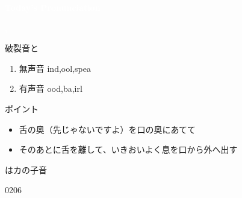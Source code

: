 \documentclass[aspectratio=169,xcolor={dvipsnames,table}]{beamer}
\begin{document}
\begin{frame}
\hypertarget{today}{}
\centering
  \textcolor{white}{\Huge\bfseries Today's Pronunciation}

 \vspace{30pt}

  \textcolor{white}{\Huge\bfseries {}, }

\end{frame}
\begin{frame}[plain,label=slide_k_g]{破裂音と}

\large

\begin{enumerate}
 \item  無声音 \hspace{20pt}ind,\hspace{1\zw}ool,\hspace{1\zw}spea
 \item  有声音 \hspace{20pt}ood,\hspace{1\zw}ba,\hspace{1\zw}irl
\end{enumerate}

\vspace*{20pt}

\normalsize
ポイント

\begin{itemize}[circle]
 \item 舌の奥（先じゃないですよ）を口の奥にあてて
 \item そのあとに舌を離して、いきおいよく息を口から外へ出す
\end{itemize}

 はカの子音

\hfill{\tiny 0206}\,{\scriptsize {}}

\hfill\hyperlink{ex}{}

\end{frame}
\end{document}
